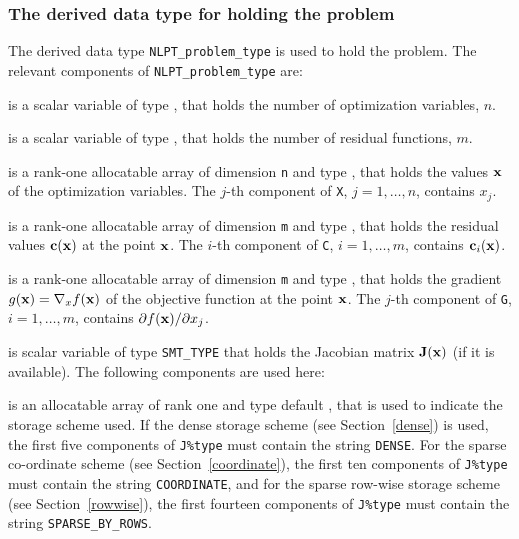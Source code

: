 \documentclass{galahad}
\begin{document}

\subsubsection{The derived data type for holding the problem}\label{typeprob}
The derived data type {\tt NLPT\_problem\_type} is used to hold
the problem. The relevant components of
{\tt NLPT\_problem\_type}
are:

\begin{description}

 is a scalar variable of type \integer,
 that holds the number of optimization variables, $n$.

 is a scalar variable of type \integer,
 that holds the number of residual functions, $m$.



 is a rank-one allocatable array of dimension {\tt n} and type
\realdp, that holds the values ${\mathbf{x}}$ of the optimization variables.
The $j$-th component of {\tt X}, $j = 1,  \ldots , n$, contains $x_{j}$.

 is a rank-one allocatable array of dimension {\tt m} and type
\realdp, that holds the residual values ${\mathbf{c}}({\mathbf{x}})$
at the point ${\mathbf{x}}$. The $i$-th component of
{\tt C}, $i = 1, \ldots, m$, contains ${\mathbf{c}}_{i}({\mathbf{x}})$.

 is a rank-one allocatable array of dimension {\tt m} and type
\realdp, that holds the gradient $g({\mathbf{x}}) = \nabla_x f({\mathbf{x}})$ of the
objective function at the point ${\mathbf{x}}$. The $j$-th component of
{\tt G}, $i = 1, \ldots, m$, contains $\partial f({\mathbf{x}})/\partial x_j$.

 is scalar variable of type {\tt SMT\_TYPE}
that holds the Jacobian matrix ${\mathbf{J}}({\mathbf{x}})$ (if it is available).
The following components are used here:

\begin{description}

 is an allocatable array of rank one and type default
\character, that
is used to indicate the storage scheme used. If the dense storage scheme
(see Section~\ref{dense}) is used,
the first five components of {\tt J\%type} must contain the
string {\tt DENSE}.
For the sparse co-ordinate scheme (see Section~\ref{coordinate}),
the first ten components of {\tt J\%type} must contain the
string {\tt COORDINATE},
and for the sparse row-wise storage scheme (see Section~\ref{rowwise}),
the first fourteen components of {\tt J\%type} must contain the
string {\tt SPARSE\_BY\_ROWS}.


\end{description}
\end{description}
\end{document}
